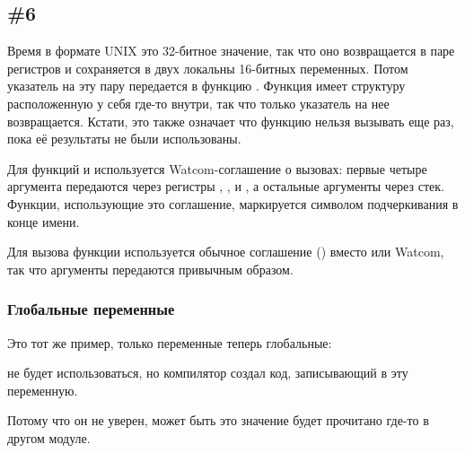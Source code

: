 \subsection{\Example{} \#6}





Время в формате UNIX это 32-битное значение, так что оно возвращается в паре регистров  и сохраняется
в двух локальны 16-битных переменных.
Потом указатель на эту пару передается в функцию
.
Функция  имеет структуру  расположенную у себя
где-то внутри, так что только указатель на нее возвращается. 
Кстати, это также означает что функцию нельзя вызывать еще раз, пока её результаты не были использованы.

Для функций  и  используется
Watcom-соглашение о вызовах: первые четыре аргумента передаются через регистры
, ,  и , а остальные аргументы через стек.
Функции, использующие это соглашение, маркируется символом подчеркивания в конце имени.

Для вызова функции  используется обычное соглашение  () вместо 
 или Watcom, так что аргументы передаются привычным образом.

\subsubsection{Глобальные переменные}

Это тот же пример, только переменные теперь глобальные:





 не будет использоваться, но компилятор создал код, записывающий в эту переменную.

Потому что он не уверен, может быть это значение будет прочитано где-то в другом модуле.

